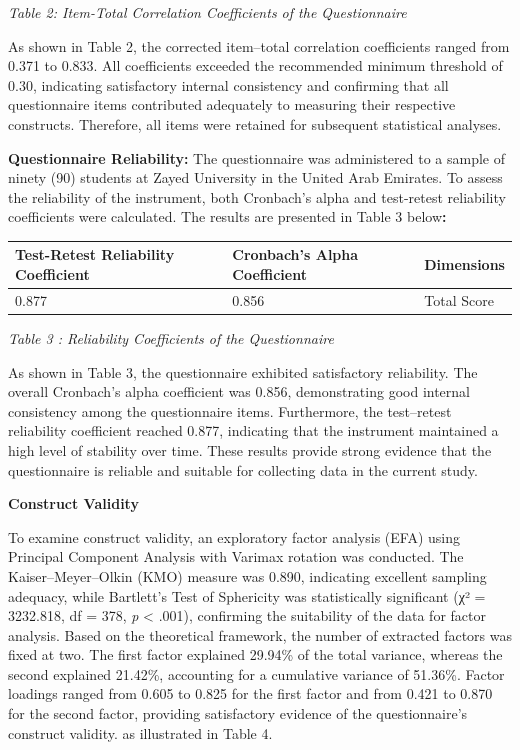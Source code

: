 \documentclass[11pt,a4paper]{article}
\begin{document}
	\textit{Table 2: Item-Total Correlation Coefficients of the Questionnaire}
	
	As shown in Table 2, the corrected item--total correlation coefficients ranged from 0.371 to 0.833. All coefficients exceeded the recommended minimum threshold of 0.30, indicating satisfactory internal consistency and confirming that all questionnaire items contributed adequately to measuring their respective constructs. Therefore, all items were retained for subsequent statistical analyses.
	
	\textbf{Questionnaire Reliability: }The questionnaire was administered to a sample of ninety (90) students at Zayed University in the United Arab Emirates. To assess the reliability of the instrument, both Cronbach's alpha and test-retest reliability coefficients were calculated. The results are presented in Table 3 below\textbf{:}
	
	\begin{table}[h]
		\centering
		\begin{tabular}{|l|l|l|}
			\hline
			Test-Retest Reliability Coefficient & Cronbach's Alpha Coefficient & Dimensions \\ \hline
			0.877 & 0.856 & Total Score \\ \hline
		\end{tabular}
	\end{table}
	
	\textit{Table 3  : Reliability Coefficients of the Questionnaire}
	
	As shown in Table 3, the questionnaire exhibited satisfactory reliability. The overall Cronbach's alpha coefficient was 0.856, demonstrating good internal consistency among the questionnaire items. Furthermore, the test--retest reliability coefficient reached 0.877, indicating that the instrument maintained a high level of stability over time. These results provide strong evidence that the questionnaire is reliable and suitable for collecting data in the current study.
	
	\textbf{Construct Validity}
	
	To examine construct validity, an exploratory factor analysis (EFA) using Principal Component Analysis with Varimax rotation was conducted. The Kaiser--Meyer--Olkin (KMO) measure was 0.890, indicating excellent sampling adequacy, while Bartlett's Test of Sphericity was statistically significant (χ² = 3232.818, df = 378, \textit{p} \textless{} .001), confirming the suitability of the data for factor analysis. Based on the theoretical framework, the number of extracted factors was fixed at two. The first factor explained 29.94\% of the total variance, whereas the second explained 21.42\%, accounting for a cumulative variance of 51.36\%. Factor loadings ranged from 0.605 to 0.825 for the first factor and from 0.421 to 0.870 for the second factor, providing satisfactory evidence of the questionnaire's construct validity. as illustrated in Table  4.
	
\end{document}

